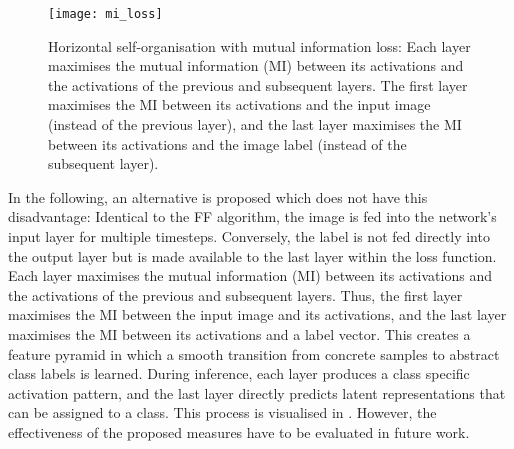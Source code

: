 \begin{figure}[h]
    \centering
    \texttt{[image: mi\_loss]}
    \caption[Horizontal self-organisation with mutual information loss]{Horizontal self-organisation with mutual information loss: Each layer maximises the mutual information (MI) between its activations and the activations of the previous and subsequent layers. The first layer maximises the MI between its activations and the input image (instead of the previous layer), and the last layer maximises the MI between its activations and the image label (instead of the subsequent layer).}
\end{figure}

In the following, an alternative is proposed which does not have this disadvantage: Identical to the FF algorithm, the image is fed into the network's input layer for multiple timesteps. Conversely, the label is not fed directly into the output layer but is made available to the last layer within the loss function. Each layer maximises the mutual information (MI) between its activations and the activations of the previous and subsequent layers. Thus, the first layer maximises the MI between the input image and its activations, and the last layer maximises the MI between its activations and a label vector. This creates a feature pyramid in which a smooth transition from concrete samples to abstract class labels is learned. During inference, each layer produces a class specific activation pattern, and the last layer directly predicts latent representations that can be assigned to a class. This process is visualised in .  However, the effectiveness of the proposed measures have to be evaluated in future work.



